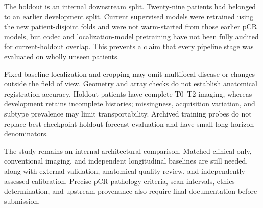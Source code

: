 The holdout is an internal downstream split. Twenty-nine patients had belonged to an earlier development split. Current supervised models were retrained using the new patient-disjoint folds and were not warm-started from those earlier pCR models, but codec and localization-model pretraining have not been fully audited for current-holdout overlap. This prevents a claim that every pipeline stage was evaluated on wholly unseen patients.

Fixed baseline localization and cropping may omit multifocal disease or changes outside the field of view. Geometry and array checks do not establish anatomical registration accuracy. Holdout patients have complete T0--T2 imaging, whereas development retains incomplete histories; missingness, acquisition variation, and subtype prevalence may limit transportability. Archived training probes do not replace best-checkpoint holdout forecast evaluation and have small long-horizon denominators.

The study remains an internal architectural comparison. Matched clinical-only, conventional imaging, and independent longitudinal baselines are still needed, along with external validation, anatomical quality review, and independently assessed calibration. Precise pCR pathology criteria, scan intervals, ethics determination, and upstream provenance also require final documentation before submission.
